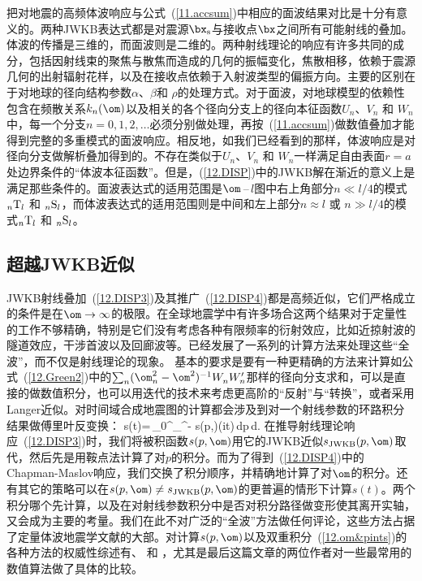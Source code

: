 把对地震的高频体波响应与公式~(\ref{11.accsum})中相应的面波结果对比是十分有意义的。两种JWKB表达式都是对震源$\bx_{\rm s}$与接收点$\bx$之间所有可能射线的叠加。体波的传播是三维的，而面波则是二维的。两种射线理论的响应有许多共同的成分，包括因射线束的聚焦与散焦而造成的几何的振幅变化，焦散相移，依赖于震源几何的出射辐射花样，以及在接收点依赖于入射波类型的偏振方向。主要的区别在于对地球的径向结构参数$\alpha$、$\beta$和
$\rho$的处理方式。对于面波，对地球模型的依赖性包含在频散关系$k_n(\om)$以及相关的各个径向分支上的径向本征函数$U_n$、$V_n$ 和 $W_n$中，每一个分支$n=0,1,2,\ldots$必须分别做处理，再按~(\ref{11.accsum})做数值叠加才能得到完整的多重模式的面波响应。相反地，如我们已经看到的那样，体波响应是对径向分支做解析叠加得到的。不存在类似于$U_n$、$V_n$ 和 $W_n$一样满足自由表面$r=a$处边界条件的“体波本征函数”。但是，(\ref{12.DISP})中的JWKB解在渐近的意义上是满足那些条件的。面波表达式的适用范围是$\om\,$--$\,l$图中右上角部分$n\ll l/4$的模式${}_n{\rm T}_l$
和 ${}_n{\rm S}_l$，而体波表达式的适用范围则是中间和左上部分$n\approx l$ 或 $n\gg l/4$的模式${}_n{\rm T}_l$
和 ${}_n{\rm S}_l$。
%
%
%
%

\renewcommand{\thesubsection}{$\!\!\!\raise1.3ex\hbox{$\star$}\!\!$
\arabic{chapter}.\arabic{section}.\arabic{subsection}}
\subsection{超越JWKB近似}
\renewcommand{\thesubsection}{\arabic{chapter}.\arabic{section}.\arabic{subsection}}

JWKB射线叠加~(\ref{12.DISP3})及其推广~(\ref{12.DISP4})都是高频近似，它们严格成立的条件是在$\om\rightarrow\infty$的极限。在全球地震学中有许多场合这两个结果对于定量性的工作不够精确，特别是它们没有考虑各种有限频率的衍射效应，比如近掠射波的隧道效应，干涉首波以及回廊波等。已经发展了一系列的计算方法来处理这些“全波”，而不仅是射线理论的现象。
%
基本的要求是要有一种更精确的方法来计算如公式~(\ref{12.Green2})中的$\sum_n(\om_n^2-\om^2)^{-1}
W_n^{}W_n^{\prime}$那样的径向分支求和，可以是直接的做数值积分，也可以用迭代的技术来考虑更高阶的“反射”与“转换”，或者采用Langer近似。对时间域合成地震图的计算都会涉及到对一个射线参数的环路积分结果做傅里叶反变换：
\eq \label{12.om&pints}
s(t)=\,\int_0^{\infty}\!\!\int_{\infty}^{-\infty}
\!s(p,\om)\exp(i\om t)\,dp\,d\om.
\en
在推导射线理论响应~(\ref{12.DISP3})时，我们将被积函数$s(p,\om)$用它的JWKB近似$s_{\rm JWKB}(p,\om)$取代，然后先是用鞍点法计算了对$p$的积分。而为了得到~(\ref{12.DISP4})中的Chapman-Maslov响应，我们交换了积分顺序，并精确地计算了对$\om$的积分。还有其它的策略可以在$s(p,\om)\not=s_{\rm JWKB}(p,\om)$的更普遍的情形下计算$s(t)$。两个积分哪个先计算，以及在对射线参数积分中是否对积分路径做变形使其离开实轴，又会成为主要的考量。我们在此不对广泛的“全波”方法做任何评论，这些方法占据了定量体波地震学文献的大部。对计算$s(p,\om)$以及双重积分~(\ref{12.om&pints})的各种方法的权威性综述有\textcite{aki&richards80}、
\textcite{kennett83} 和 \textcite{chapman&orcutt85}，尤其是最后这篇文章的两位作者对一些最常用的数值算法做了具体的比较。
%
%
